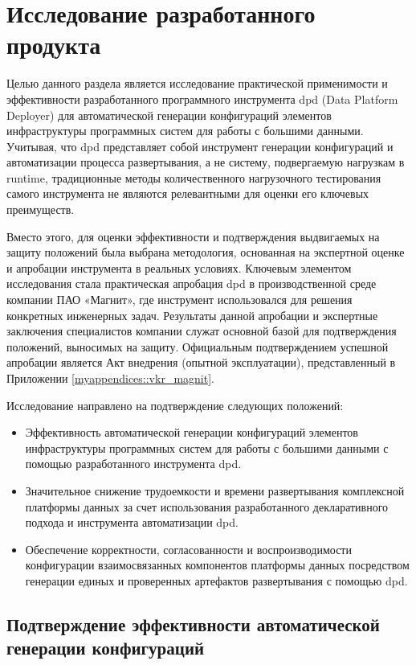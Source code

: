 \chapter{Исследование разработанного продукта} \label{ch5}

Целью данного раздела является исследование практической применимости и эффективности разработанного программного инструмента dpd (Data Platform Deployer) для автоматической генерации конфигураций элементов инфраструктуры программных систем для работы с большими данными. Учитывая, что dpd представляет собой инструмент генерации конфигураций и автоматизации процесса развертывания, а не систему, подвергаемую нагрузкам в runtime, традиционные методы количественного нагрузочного тестирования самого инструмента не являются релевантными для оценки его ключевых преимуществ.

Вместо этого, для оценки эффективности и подтверждения выдвигаемых на защиту положений была выбрана методология, основанная на экспертной оценке и апробации инструмента в реальных условиях. Ключевым элементом исследования стала практическая апробация dpd в производственной среде компании ПАО «Магнит», где инструмент использовался для решения конкретных инженерных задач. Результаты данной апробации и экспертные заключения специалистов компании служат основной базой для подтверждения положений, выносимых на защиту. Официальным подтверждением успешной апробации является Акт внедрения (опытной эксплуатации), представленный в Приложении \ref{myappendices::vkr_magnit}.

Исследование направлено на подтверждение следующих положений:

\begin{itemize}
    \item Эффективность автоматической генерации конфигураций элементов инфраструктуры программных систем для работы с большими данными с помощью разработанного инструмента dpd.
    \item Значительное снижение трудоемкости и времени развертывания комплексной платформы данных за счет использования разработанного декларативного подхода и инструмента автоматизации dpd.
    \item  Обеспечение корректности, согласованности и воспроизводимости конфигурации взаимосвязанных компонентов платформы данных посредством генерации единых и проверенных артефактов развертывания с помощью dpd.
\end{itemize}
\section{Подтверждение эффективности автоматической генерации конфигураций}

